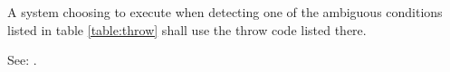 A system choosing to execute  when detecting one of the
ambiguous conditions listed in table \ref{table:throw} shall use the
throw code listed there.

See: .


\newcommand{\throwdef}[3][\empty]{%
	\ifx\empty#1%
		\defthrowcode{#2}{#3}
		\newline
	\else
		\cbstart
			\uline{\defthrowcode{#2}{#3}}
			\hfill{\tiny\textsf{#1}}
		\cbend\newline
	\fi
}


\newcommand{\defthrowcode}[2]{%
	\makebox[1.6em][r]{#1}\hspace{1em}#2
}


